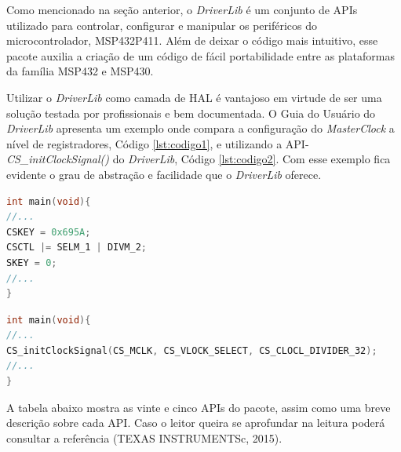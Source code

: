 Como mencionado na seção anterior, o \textit{DriverLib} é um conjunto de APIs utilizado para controlar, configurar e manipular os periféricos do microcontrolador, MSP432P411. Além de deixar o código mais intuitivo, esse pacote auxilia a criação de um código de fácil portabilidade entre as plataformas da família MSP432 e MSP430.

Utilizar o \textit{DriverLib} como camada de HAL é vantajoso em virtude de ser uma solução testada por profissionais e bem documentada. O Guia do Usuário do \textit{DriverLib} apresenta um exemplo onde compara a configuração do \textit{MasterClock} a nível de registradores, Código \ref{lst:codigo1}, e utilizando a API-\textit{CS\_initClockSignal()} do \textit{DriverLib}, Código \ref{lst:codigo2}. Com esse exemplo fica evidente o grau de abstração e facilidade que o \textit{DriverLib} oferece.

%
\renewcommand{\lstlistingname}{Código}
\begin{lstlisting}[caption={Configurando o MasterClock a nível de registrador},label={lst:codigo1},language=C]
int main(void){
//...
CSKEY = 0x695A;
CSCTL |= SELM_1 | DIVM_2;
SKEY = 0;
//...
}
\end{lstlisting}

\begin{lstlisting}[caption={Configurando o MasterClock com a API do DriverLib},label={lst:codigo2},language=C]
int main(void){
//...
CS_initClockSignal(CS_MCLK, CS_VLOCK_SELECT, CS_CLOCL_DIVIDER_32);
//...
}
\end{lstlisting}

A tabela abaixo mostra as vinte e cinco APIs do pacote, assim como  uma breve descrição sobre cada API. Caso o leitor queira se aprofundar na leitura poderá consultar a referência (TEXAS INSTRUMENTSc, 2015). 

